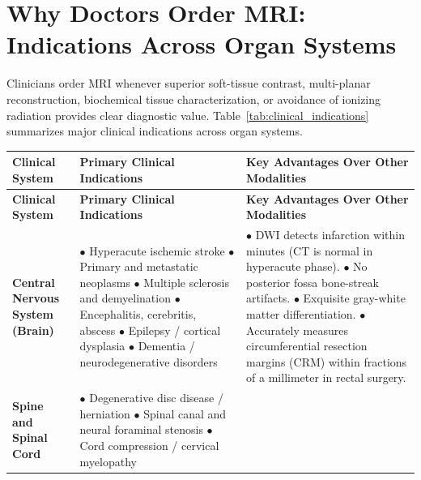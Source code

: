 \documentclass[11pt,a4paper]{article}
\begin{document}
\section{Why Doctors Order MRI: Indications Across Organ Systems}

Clinicians order MRI whenever superior soft-tissue contrast, multi-planar reconstruction, biochemical tissue characterization, or avoidance of ionizing radiation provides clear diagnostic value. Table~\ref{tab:clinical_indications} summarizes major clinical indications across organ systems.

\begin{longtable}{p{3.2cm}p{6cm}p{6cm}}
\toprule
\textbf{Clinical System} & \textbf{Primary Clinical Indications} & \textbf{Key Advantages Over Other Modalities} \\
\midrule
\endfirsthead
\toprule
\textbf{Clinical System} & \textbf{Primary Clinical Indications} & \textbf{Key Advantages Over Other Modalities} \\
\midrule
\endhead
\bottomrule
\endfoot
\textbf{Central Nervous System (Brain)} & 
$\bullet$ Hyperacute ischemic stroke\newline
$\bullet$ Primary and metastatic neoplasms\newline
$\bullet$ Multiple sclerosis and demyelination\newline
$\bullet$ Encephalitis, cerebritis, abscess\newline
$\bullet$ Epilepsy / cortical dysplasia\newline
$\bullet$ Dementia / neurodegenerative disorders & 
$\bullet$ DWI detects infarction within minutes (CT is normal in hyperacute phase).\newline
$\bullet$ No posterior fossa bone-streak artifacts.\newline
$\bullet$ Exquisite gray-white matter differentiation.\newline
$\bullet$ Accurately measures circumferential resection margins (CRM) within fractions of a millimeter in rectal surgery. \\
\midrule
\textbf{Spine and Spinal Cord} & 
$\bullet$ Degenerative disc disease / herniation\newline
$\bullet$ Spinal canal and neural foraminal stenosis\newline
$\bullet$ Cord compression / cervical myelopathy\newline

\end{longtable}
\end{document}

